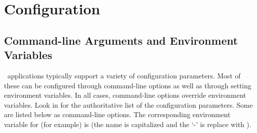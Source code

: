 %
%
%
\section{Configuration}

\subsection{Command-line Arguments and Environment Variables}
\label{subsect:config}
\ensemble\ applications typically support a variety of configuration
parameters.  Most of these can be configured through command-line options as
well as through setting environment variables.  In all cases, command-line
options override environment variables.  Look in  for the
authoritative list of the configuration parameters.  Some are listed below as
command-line options.  The corresponding environment variable for
 (for example) is  (the name is
capitalized and the `-' is replace with ).
